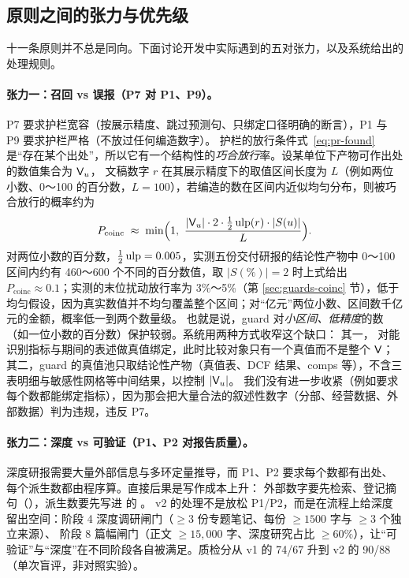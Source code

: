 \subsection{原则之间的张力与优先级}
\label{sec:pr-tension}

十一条原则并不总是同向。下面讨论开发中实际遇到的五对张力，以及系统给出的处理规则。

\paragraph{张力一：召回 vs 误报（P7 对 P1、P9）。}
P7 要求护栏宽容（按展示精度、跳过预测句、只绑定口径明确的断言），P1 与 P9 要求护栏严格（不放过任何编造数字）。
护栏的放行条件式~\eqref{eq:pr-found} 是“存在某个出处”，所以它有一个结构性的\emph{巧合放行}率。设某单位下产物可作出处的数值集合为 $\mathsf{V}_u$，
文稿数字 $r$ 在其展示精度下的取值区间长度为 $L$（例如两位小数、0～100 的百分数，$L=100$），若编造的数在区间内近似均匀分布，则被巧合放行的概率约为
\begin{equation}
  P_{\text{coinc}} \;\approx\; \min\Bigl(1,\ \frac{|\prVal_u|\cdot 2\cdot\halfulp(r)\cdot|S(u)|}{L}\Bigr).
  \label{eq:pr-coinc}
\end{equation}
对两位小数的百分数，$\tfrac12\operatorname{ulp}=0.005$，实测五份交付研报的结论性产物中 0～100 区间内约有 460～600 个不同的百分数值，取 $|S(\%)|=2$ 时上式给出 $P_{\text{coinc}}\approx 0.1$；实测的末位扰动放行率为 3\%～5\%（第 \ref{sec:guards-coinc} 节），低于均匀假设，因为真实数值并不均匀覆盖整个区间；对“亿元”两位小数、区间数千亿元的金额，概率低一到两个数量级。
也就是说，guard 对\emph{小区间、低精度}的数（如一位小数的百分数）保护较弱。系统用两种方式收窄这个缺口：
其一， 对能识别指标与期间的表述做真值绑定，此时比较对象只有一个真值而不是整个 $\mathsf{V}$；
其二，guard 的真值池只取结论性产物（真值表、DCF 结果、comps 等），不含三表明细与敏感性网格等中间结果，以控制 $|\mathsf{V}_u|$。
我们没有进一步收紧（例如要求每个数都能绑定指标），因为那会把大量合法的叙述性数字（分部、经营数据、外部数据）判为违规，违反 P7。

\paragraph{张力二：深度 vs 可验证（P1、P2 对报告质量）。}
深度研报需要大量外部信息与多环定量推导，而 P1、P2 要求每个数都有出处、每个派生数都由程序算。直接后果是写作成本上升：
外部数字要先检索、登记摘句（），派生数要先写进  的 。
v2 的处理不是放松 P1/P2，而是在流程上给深度留出空间：阶段 4 深度调研闸门（$\ge3$ 份专题笔记、每份 $\ge1500$ 字与 $\ge3$ 个独立来源）、
阶段 8 篇幅闸门（正文 $\ge15{,}000$ 字、深度研究占比 $\ge60\%$），让“可验证”与“深度”在不同阶段各自被满足。质检分从 v1 的 74/67 升到 v2 的 90/88（单次盲评，非对照实验）。


